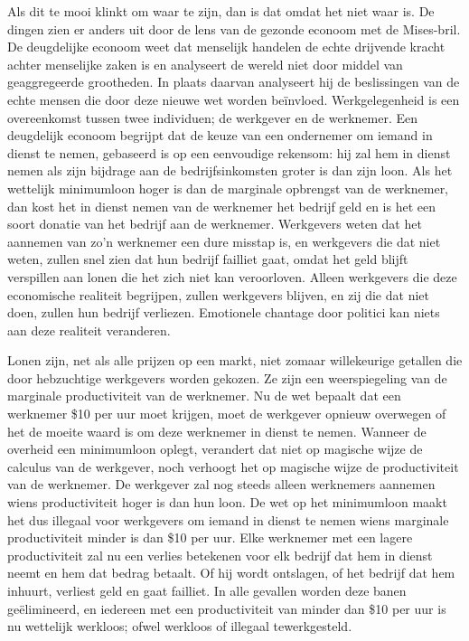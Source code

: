 Als dit te mooi klinkt om waar te zijn, dan is dat omdat het niet waar is. De dingen zien er anders uit door de lens van de gezonde econoom met de Mises-bril. De deugdelijke econoom weet dat menselijk handelen de echte drijvende kracht achter menselijke zaken is en analyseert de wereld niet door middel van geaggregeerde grootheden. In plaats daarvan analyseert hij de beslissingen van de echte mensen die door deze nieuwe wet worden beïnvloed. Werkgelegenheid is een overeenkomst tussen twee individuen; de werkgever en de werknemer. Een deugdelijk econoom begrijpt dat de keuze van een ondernemer om iemand in dienst te nemen, gebaseerd is op een eenvoudige rekensom: hij zal hem in dienst nemen als zijn bijdrage aan de bedrijfsinkomsten groter is dan zijn loon. Als het wettelijk minimumloon hoger is dan de marginale opbrengst van de werknemer, dan kost het in dienst nemen van de werknemer het bedrijf geld en is het een soort donatie van het bedrijf aan de werknemer. Werkgevers weten dat het aannemen van zo’n werknemer een dure misstap is, en werkgevers die dat niet weten, zullen snel zien dat hun bedrijf failliet gaat, omdat het geld blijft verspillen aan lonen die het zich niet kan veroorloven. Alleen werkgevers die deze economische realiteit begrijpen, zullen werkgevers blijven, en zij die dat niet doen, zullen hun bedrijf verliezen. Emotionele chantage door politici kan niets aan deze realiteit veranderen.

Lonen zijn, net als alle prijzen op een markt, niet zomaar willekeurige getallen die door hebzuchtige werkgevers worden gekozen. Ze zijn een weerspiegeling van de marginale productiviteit van de werknemer. Nu de wet bepaalt dat een werknemer \$10 per uur moet krijgen, moet de werkgever opnieuw overwegen of het de moeite waard is om deze werknemer in dienst te nemen. Wanneer de overheid een minimumloon oplegt, verandert dat niet op magische wijze de calculus van de werkgever, noch verhoogt het op magische wijze de productiviteit van de werknemer. De werkgever zal nog steeds alleen werknemers aannemen wiens productiviteit hoger is dan hun loon. De wet op het minimumloon maakt het dus illegaal voor werkgevers om iemand in dienst te nemen wiens marginale productiviteit minder is dan \$10 per uur. Elke werknemer met een lagere productiviteit zal nu een verlies betekenen voor elk bedrijf dat hem in dienst neemt en hem dat bedrag betaalt. Of hij wordt ontslagen, of het bedrijf dat hem inhuurt, verliest geld en gaat failliet. In alle gevallen worden deze banen geëlimineerd, en iedereen met een productiviteit van minder dan \$10 per uur is nu wettelijk werkloos; ofwel werkloos of illegaal tewerkgesteld.

